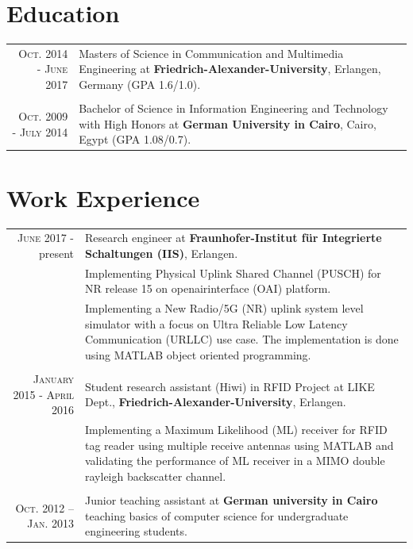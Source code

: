 \documentclass[a4paper,10pt]{article}
\begin{document}
\section{Education}
\begin{tabular}{r|p{9cm}}	
\textsc{Oct.} 2014 - \textsc{June} 2017 & Masters of Science in Communication and Multimedia Engineering at {\bf Friedrich-Alexander-University}, Erlangen, Germany (GPA 1.6/1.0). \\
& \\

 \textsc{Oct.} 2009 - \textsc{July} 2014 & Bachelor of Science in Information Engineering and Technology with High Honors at {\bf German University in Cairo}, Cairo, Egypt (GPA 1.08/0.7).\\
\end{tabular}

\section{Work Experience}
\begin{tabular}{r|p{9cm}}
	\textsc{June} 2017 - present & Research engineer at {\bf Fraunhofer-Institut für Integrierte Schaltungen (IIS)}, Erlangen.\\
	& Implementing Physical Uplink Shared Channel (PUSCH) for NR release 15 on openairinterface (OAI) platform. \\
	& Implementing a New Radio/5G (NR) uplink system level simulator with a focus on Ultra Reliable Low Latency Communication (URLLC) use case. The implementation is done using MATLAB object oriented programming.\\
	& \\	
	\textsc{January} 2015 - \textsc{April} 2016 & Student research assistant (Hiwi) in RFID Project at LIKE Dept., {\bf Friedrich-Alexander-University}, Erlangen.\\
	& Implementing a Maximum Likelihood (ML) receiver for RFID tag reader using multiple receive antennas using MATLAB and validating the performance of ML receiver in a MIMO double rayleigh backscatter channel. \\ 
	& \\ 
	\textsc{Oct. 2012 – Jan. 2013} & Junior teaching assistant at {\bf German university in Cairo} teaching basics of computer science for undergraduate engineering students. \\
\end{tabular}
\end{document}
